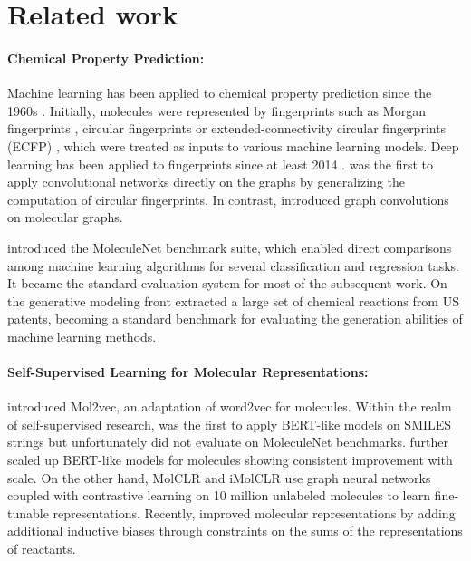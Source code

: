 \documentclass{article} %
\begin{document}
\section{Related work}
\paragraph{Chemical Property Prediction:}
Machine learning has been applied to chemical property prediction since the 1960s \citep{qsar-history}. Initially, molecules were represented by fingerprints such as Morgan fingerprints \citep{morgan-fingerprints}, circular fingerprints \citep{circular-fingerprints} or extended-connectivity circular fingerprints (ECFP) \citep{ECFP-fingerprints}, which were treated as inputs to various machine learning models. Deep learning has been applied to fingerprints since at least 2014 \citep{NN-QSAR-2014}. \citet{CNN-on-molecules} was the first to apply convolutional networks directly on the graphs by generalizing the computation of circular fingerprints. In contrast, \citet{GCN-on-molecules} introduced graph convolutions on molecular graphs.

\citet{moleculenet} introduced the MoleculeNet benchmark suite, which enabled direct comparisons among machine learning algorithms for several classification and regression tasks. It became the standard evaluation system for most of the subsequent work. On the generative modeling front \citet{lowe-USPTO-2012} extracted a large set of chemical reactions from US patents, becoming a standard benchmark for evaluating the generation abilities of machine learning methods. 

\paragraph{Self-Supervised Learning for Molecular Representations:}
\citet{mol2vec} introduced Mol2vec, an adaptation of word2vec for molecules. Within the realm of self-supervised research, \citet{SMILES_BERT} was the first to apply BERT-like models on SMILES strings but unfortunately did not evaluate on MoleculeNet benchmarks. \citet{chemberta} further scaled up BERT-like models for molecules showing consistent improvement with scale. On the other hand, MolCLR \citet{MolCLR} and iMolCLR \citet{iMolCLR} use graph neural networks coupled with contrastive learning on 10 million unlabeled molecules to learn fine-tunable representations. Recently, \citet{reaction-aware-molRL} improved molecular representations by adding additional inductive biases through constraints on the sums of the representations of reactants. 
\end{document}
